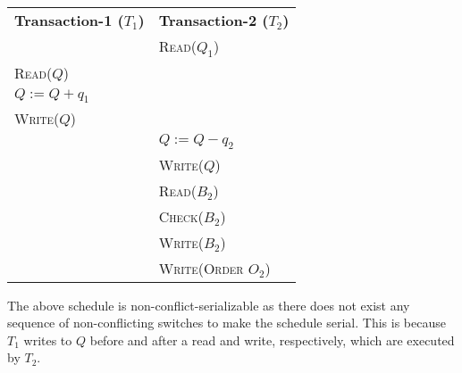 \begin{center}
    \begin{adjustbox}{width=\textwidth}
        \begin{tabularx}{\textwidth}{|X|X|}
        \hline
        \multirow{2}{*}{\textbf{Transaction-1 ($T_{1}$)}} & \multirow{2}{*}{\textbf{Transaction-2 ($T_{2}$)}} \\
        & \\ \hline
        & \textsc{Read($Q_{1}$)} \\
        \textsc{Read($Q$)} & \\
        \textsc{$Q := Q + q_{1}$} & \\
        \textsc{Write($Q$)} & \\
        & \textsc{$Q := Q - q_{2}$} \\
        & \textsc{Write($Q$)} \\
        & \textsc{Read($B_{2}$)} \\
        & \textsc{Check($B_{2}$)} \\
        & \textsc{Write($B_{2}$)} \\
        & \textsc{Write(Order $O_{2}$)} \\
        \hline
        \end{tabularx}
    \end{adjustbox}
\end{center}
\vspace*{10pt}
The above schedule is non-conflict-serializable as there does not exist any sequence of
non-conflicting switches to make the schedule serial. This is because $T_{1}$ writes to $Q$
before and after a read and write, respectively, which are executed by $T_{2}$.
